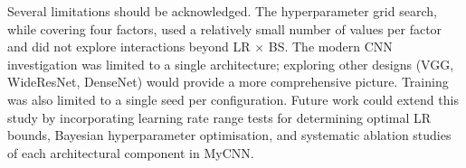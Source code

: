 \documentclass{article}
\begin{document}
Several limitations should be acknowledged. 
The hyperparameter grid search, while covering four factors, 
used a relatively small number of values per factor and did not explore interactions beyond LR $\times$ BS. 
The modern CNN investigation was limited to a single architecture; 
exploring other designs (VGG, WideResNet, DenseNet) would provide a more comprehensive picture. 
Training was also limited to a single seed per configuration. 
Future work could extend this study by incorporating learning rate range tests for determining optimal LR bounds, 
Bayesian hyperparameter optimisation, and systematic ablation studies of each architectural component in MyCNN.


\end{document}
